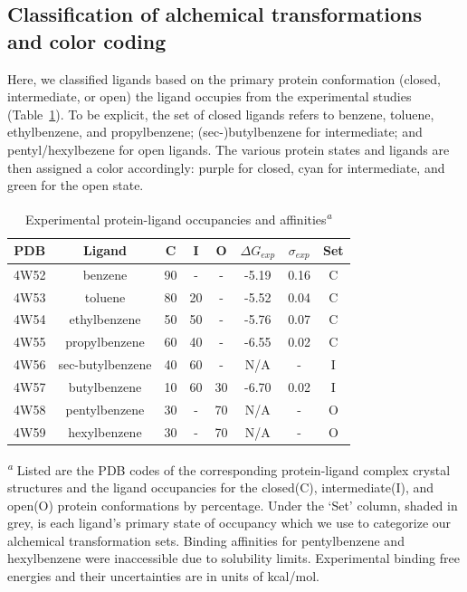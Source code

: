 \subsection{Classification of alchemical transformations and color coding}
Here, we classified ligands based on the primary protein conformation (closed, intermediate, or open) the ligand occupies from the experimental studies (Table~\ref{tbl:expdata}).
To be explicit, the set of closed ligands refers to benzene, toluene, ethylbenzene, and propylbenzene; (sec-)butylbenzene for intermediate; and pentyl/hexylbezene for open ligands.
The various protein states and ligands are then assigned a color accordingly: purple for closed, cyan for intermediate, and green for the open state.

\begin{table}[!htb]
\centering
\caption{Experimental protein-ligand occupancies and affinities\textsuperscript{\emph{a}}}
\label{tbl:expdata}
\begin{tabular}{|c|c|c|c|c|c|c|c|}
\hline
\textbf{PDB}  & \textbf{Ligand} & \textbf{C} & \textbf{I} & \textbf{O} & \boldmath$\Delta G_{exp}$  & \boldmath$\sigma_{exp}$ &  \textbf{Set} \\ \hline
4W52   &  benzene          & \cellcolor[HTML]{C0C0C0}90   & -     & -    & -5.19      & 0.16       &  C             \\ \hline
4W53   &  toluene          & \cellcolor[HTML]{C0C0C0}80   & 20   & -    & -5.52      & 0.04       & C   \\ \hline
4W54   &  ethylbenzene     & \cellcolor[HTML]{C0C0C0}50    & 50   & -    & -5.76      & 0.07       & C   \\ \hline
4W55   &  propylbenzene  & \cellcolor[HTML]{C0C0C0}60    & 40   & -    & -6.55      & 0.02       & C   \\ \hline
4W56   &  sec-butylbenzene & 40        & \cellcolor[HTML]{C0C0C0}60      & -    & N/A      & -     &  I   \\ \hline
4W57   &  butylbenzene   & 10        & \cellcolor[HTML]{C0C0C0}60      & 30   & -6.70   & 0.02  &  I   \\ \hline
4W58   &  pentylbenzene  & 30        &  -       & \cellcolor[HTML]{C0C0C0}70  & N/A     & -      &  O   \\ \hline
4W59   &  hexylbenzene   & 30        &  -       & \cellcolor[HTML]{C0C0C0}70  & N/A     & -     & O   \\ \hline
\end{tabular}

\textsuperscript{\emph{a}} Listed are the PDB codes of the corresponding protein-ligand complex crystal structures and the ligand occupancies\cite{Merski2015} for the closed(C), intermediate(I), and open(O) protein conformations by percentage.
Under the `Set' column, shaded in grey, is each ligand's primary state of occupancy which we use to categorize our alchemical transformation sets.
Binding affinities for pentylbenzene and hexylbenzene were inaccessible due to solubility limits\cite{Merski2015}.
Experimental binding free energies and their uncertainties are in units of kcal/mol\cite{T4affinity}.
\end{table}

